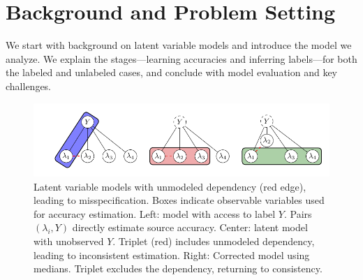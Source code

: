 \section{Background and Problem Setting} \label{sec:background}
\vspace{-.5em}
We start with background on latent variable models and introduce the model we analyze. We explain the stages---learning accuracies and inferring labels---for both the labeled and unlabeled cases, and conclude with model evaluation and key challenges.

\begin{figure}
    \centering
    \hspace*{-.5cm}\includegraphics[width=.7\textwidth]{figures/models.pdf}
    \caption{Latent variable models with unmodeled dependency (red edge), leading to misspecification. Boxes indicate observable variables used for accuracy estimation. Left: model with access to label $Y$. Pairs $(\lambda_i, Y)$ directly estimate source accuracy. Center: latent model with unobserved $Y$. Triplet (red) includes unmodeled dependency, leading to inconsistent estimation. Right: Corrected model using medians. Triplet excludes the dependency, returning to consistency.}
    \label{fig:biases}
\end{figure}



